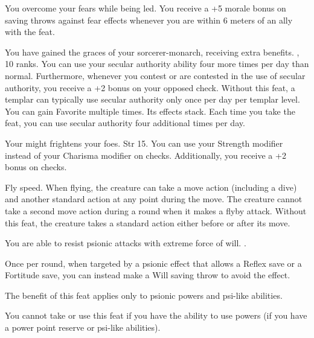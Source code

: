 {You overcome your fears while being led.}{}
{You receive a +5 morale bonus on saving throws against fear effects whenever you are within 6 meters of an ally with the  feat.}{}{}

{You have gained the graces of your sorcerer-monarch, receiving extra benefits.}
{,  10 ranks.}
{You can use your secular authority ability four more times per day than normal. Furthermore, whenever you contest or are contested in the use of secular authority, you receive a +2 bonus on your opposed  check.}
{Without this feat, a templar can typically use secular authority only once per day per templar level.}
{You can gain Favorite multiple times. Its effects stack. Each time you take the feat, you can use secular authority four additional times per day.}

{Your might frightens your foes.}
{Str 15.}
{You can use your Strength modifier instead of your Charisma modifier on  checks. Additionally, you receive a +2 bonus on  checks.}{}{}

{}
{Fly speed.}
{When flying, the creature can take a move action (including a dive) and another standard action at any point during the move. The creature cannot take a second move action during a round when it makes a flyby attack.}
{Without this feat, the creature takes a standard action either before or after its move.}
{}

{You are able to resist psionic attacks with extreme force of will.}
{.}
{Once per round, when targeted by a psionic effect that allows a Reflex save or a Fortitude save, you can instead make a Will saving throw to avoid the effect.

The benefit of this feat applies only to psionic powers and psi-like abilities. %
}{}
{You cannot take or use this feat if you have the ability to use powers (if you have a power point reserve or psi-like abilities).}

